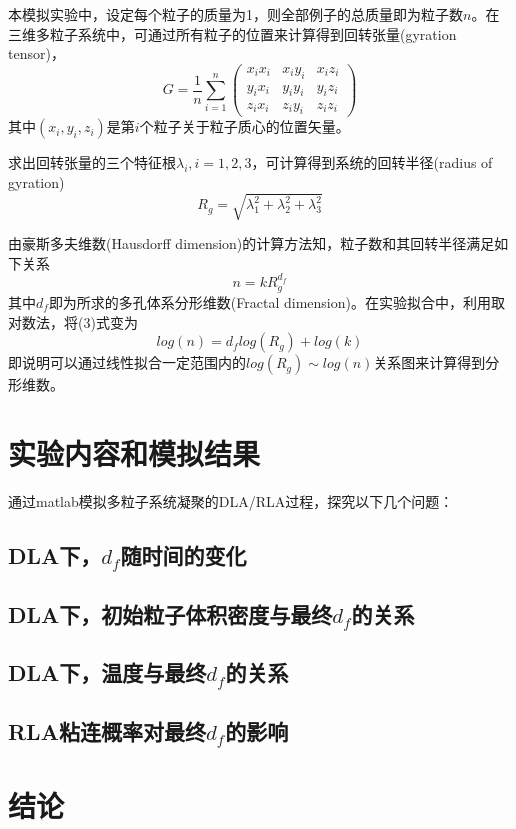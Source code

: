 \documentclass[lang=cn,11pt,a4paper,cite=authoryear]{elegantpaper}
\begin{document}
本模拟实验中，设定每个粒子的质量为1，则全部例子的总质量即为粒子数$n$。在三维多粒子系统中，可通过所有粒子的位置来计算得到回转张量(gyration tensor)，
\begin{equation}
    G = \frac{1}{n}\sum\limits_{i = 1}^n
    \left(
        \begin{matrix}
            x_ix_i & x_iy_i & x_iz_i\\
            y_ix_i & y_iy_i & y_iz_i\\
            z_ix_i & z_iy_i & z_iz_i
        \end{matrix}
    \right)
\end{equation}
其中\((x_i, y_i, z_i)\)是第$i$个粒子关于粒子质心的位置矢量。

求出回转张量的三个特征根$\lambda_i, i = 1, 2, 3$，可计算得到系统的回转半径(radius of gyration)
\begin{equation}
    R_g = \sqrt{\lambda_1^2 + \lambda_2^2 + \lambda_3^2}
\end{equation}

由豪斯多夫维数(Hausdorff dimension)的计算方法知，粒子数和其回转半径满足如下关系
\begin{equation}
    n = kR_g^{d_f}
\end{equation}
其中$d_f$即为所求的多孔体系分形维数(Fractal dimension)。在实验拟合中，利用取对数法，将(3)式变为
\begin{equation}
    log(n) = d_flog(R_g) + log(k)
\end{equation}
即说明可以通过线性拟合一定范围内的$log(R_g)\sim log(n)$关系图来计算得到分形维数。

\section{实验内容和模拟结果}
通过matlab模拟多粒子系统凝聚的DLA/RLA过程，探究以下几个问题：
\subsection{DLA下，$d_f$随时间的变化}

\subsection{DLA下，初始粒子体积密度与最终$d_f$的关系}
\subsection{DLA下，温度与最终$d_f$的关系}
\subsection{RLA粘连概率对最终$d_f$的影响}

\section{结论}
\end{document}
